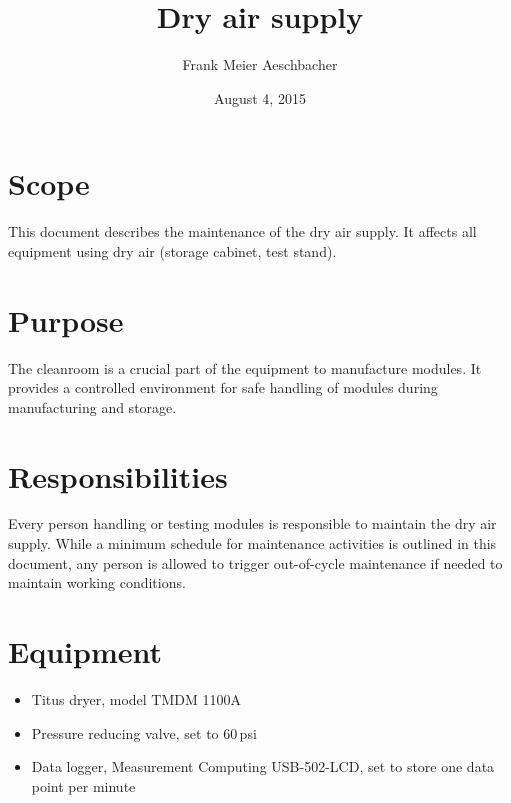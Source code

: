 \documentclass[12pt]{unlsilabsop}
\title{Dry air supply}
\date{August 4, 2015}
\author{Frank Meier Aeschbacher}
\begin{document}
\maketitle

\section{Scope}
This document describes the maintenance of the dry air supply. It affects all equipment using dry air (storage cabinet, test stand).

\section{Purpose}
The cleanroom is a crucial part of the equipment to manufacture modules. It provides a controlled environment for safe handling of modules during manufacturing and storage.


\section{Responsibilities}
Every person handling or testing modules is responsible to maintain the dry air supply. While a minimum schedule for maintenance activities is outlined in this document, any person is allowed to trigger out-of-cycle maintenance if needed to maintain working conditions.

\section{Equipment}

\begin{itemize}
    \item Titus dryer, model TMDM 1100A
    \item Pressure reducing valve, set to 60\,psi
    \item Data logger, Measurement Computing USB-502-LCD, set to store one data point per minute
\end{itemize}
\end{document}
